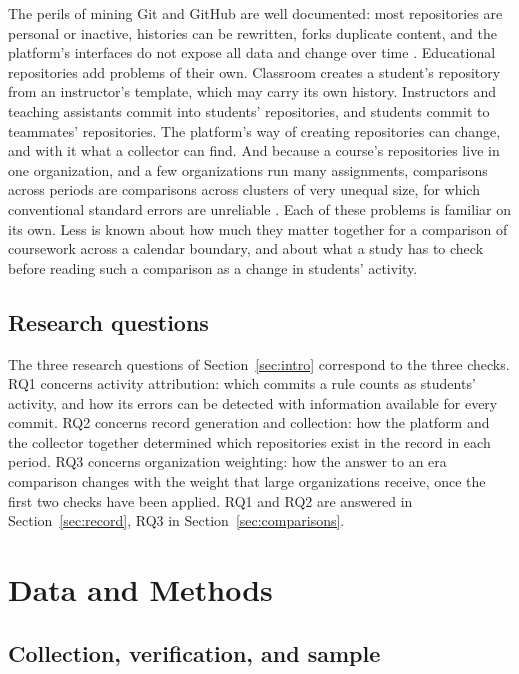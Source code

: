 \documentclass[acmsmall,screen,review,anonymous]{acmart}
\begin{document}
The perils of mining Git and GitHub are well documented: most repositories are personal or inactive, histories can be rewritten, forks duplicate content, and the platform's interfaces do not expose all data and change over time \citep{bird2009promises, kalliamvakou2016promises}. Educational repositories add problems of their own. Classroom creates a student's repository from an instructor's template, which may carry its own history. Instructors and teaching assistants commit into students' repositories, and students commit to teammates' repositories. The platform's way of creating repositories can change, and with it what a collector can find. And because a course's repositories live in one organization, and a few organizations run many assignments, comparisons across periods are comparisons across clusters of very unequal size, for which conventional standard errors are unreliable \citep{cameron2008bootstrap, cameron2015practitioner}. Each of these problems is familiar on its own. Less is known about how much they matter together for a comparison of coursework across a calendar boundary, and about what a study has to check before reading such a comparison as a change in students' activity.

\subsection{Research questions}

The three research questions of Section~\ref{sec:intro} correspond to the three checks. RQ1 concerns activity attribution: which commits a rule counts as students' activity, and how its errors can be detected with information available for every commit. RQ2 concerns record generation and collection: how the platform and the collector together determined which repositories exist in the record in each period. RQ3 concerns organization weighting: how the answer to an era comparison changes with the weight that large organizations receive, once the first two checks have been applied. RQ1 and RQ2 are answered in Section~\ref{sec:record}, RQ3 in Section~\ref{sec:comparisons}.

\section{Data and Methods}
\label{sec:methods}

\subsection{Collection, verification, and sample}
\label{sec:data}
\end{document}
